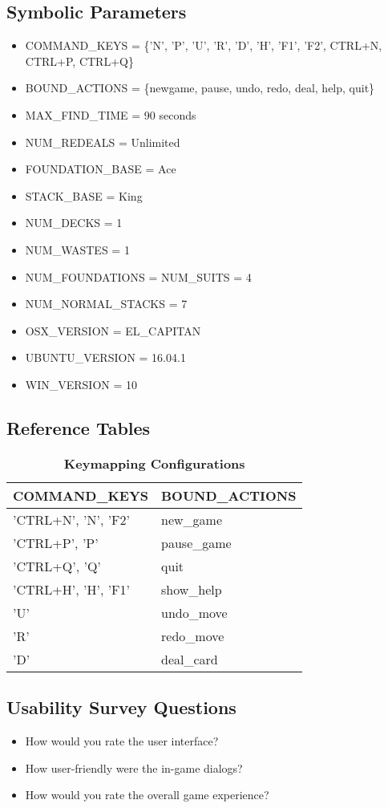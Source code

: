 \documentclass[12pt, titlepage]{article}
\begin{document}
	\subsection{Symbolic Parameters}
	\begin{itemize}
			\itemsep0em
			\item COMMAND\_KEYS = \{'N', 'P', 'U', 'R', 'D', 'H', \newline 'F1', 'F2', CTRL+N,
			CTRL+P, CTRL+Q\}
			\item BOUND\_ACTIONS = \{newgame, pause, undo, redo, deal, help, quit\}
			\item MAX\_FIND\_TIME = 90 seconds
			\item NUM\_REDEALS = Unlimited
			\item FOUNDATION\_BASE = Ace
			\item STACK\_BASE = King
			\item NUM\_DECKS = 1
			\item NUM\_WASTES = 1
			\item NUM\_FOUNDATIONS = NUM\_SUITS = 4
			\item NUM\_NORMAL\_STACKS = 7
			\item OSX\_VERSION = EL\_CAPITAN
			\item UBUNTU\_VERSION = 16.04.1
			\item WIN\_VERSION = 10
	\end{itemize}

	\subsection{Reference Tables}
	\begin{table}[hbp]
		\caption{\textbf{Keymapping Configurations}} \label{keymap}
		\begin{tabularx}{\textwidth}{p{6cm}X}
			\toprule
			\textbf{COMMAND\_KEYS} & \textbf{BOUND\_ACTIONS} \\
			\midrule
			'CTRL+N', 'N', 'F2' & new\_game\\
			'CTRL+P', 'P' & pause\_game\\
			'CTRL+Q', 'Q' & quit\\
			'CTRL+H', 'H', 'F1' & show\_help\\
			'U' & undo\_move\\
			'R' & redo\_move\\
			'D' & deal\_card\\
			\bottomrule
		\end{tabularx}
	\end{table}

	\subsection{Usability Survey Questions}
	\begin{itemize}
		\itemsep0em
		\item How would you rate the user interface?
		\item How user-friendly were the in-game dialogs?
		\item How would you rate the overall game experience?
	\end{itemize}
\end{document}
